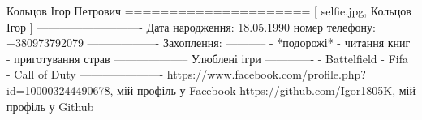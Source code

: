 Кольцов Ігор Петрович
=====================
[ selfie.jpg, Кольцов Ігор ]
----------------------------
Дата народження: 18.05.1990
номер телефону: +380973792079
-------------------
Захоплення: 
-----------
- *подорожі*
- читання книг 
- приготування страв
--------------------
Улюблені ігри
-------------
- Battelfield
- Fifa
- Call of Duty
----------------------
{ https://www.facebook.com/profile.php?id=100003244490678, мій профіль у Facebook }
{ https://github.com/Igor1805K, мій профіль у Github }